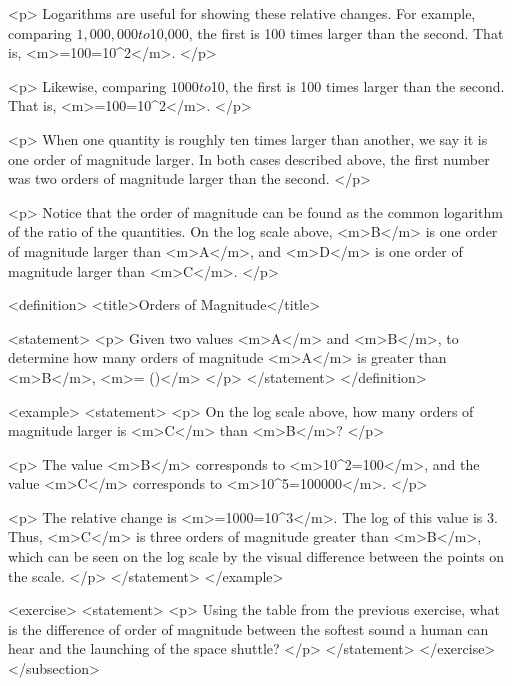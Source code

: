         <p>
            Logarithms are useful for showing these relative changes.
            For example, comparing $1,000,000 to $10,000, the first is 100 times larger than the second.
            That is, <m>=100=10^{2}</m>.
        </p>

        <p>
            Likewise, comparing $1000 to $10, the first is 100 times larger than the second.
            That is, <m>=100=10^{2}</m>.
        </p>

        <p>
            When one quantity is roughly ten times larger than another, we say it is one order of magnitude larger.
            In both cases described above, the first number was two orders of magnitude larger than the second.
        </p>

        <p>
            Notice that the order of magnitude can be found as the common logarithm of the ratio of the quantities.
            On the log scale above, <m>B</m> is one order of magnitude larger than <m>A</m>, and <m>D</m> is one order of magnitude larger than <m>C</m>.
        </p>

        <definition>
            <title>Orders of Magnitude</title>

            <statement>
                <p>
                    Given two values <m>A</m> and <m>B</m>, to determine how many orders of magnitude <m>A</m> is greater than <m>B</m>, <m>= \log()</m>
                </p>
            </statement>
        </definition>

        <example>
            <statement>
                <p>
                    On the log scale above, how many orders of magnitude larger is <m>C</m> than <m>B</m>?
                </p>

                <p>
                    The value <m>B</m> corresponds to <m>10^{2}=100</m>, and the value <m>C</m> corresponds to <m>10^{5}=100000</m>.
                </p>

                <p>
                    The relative change is <m>=1000=10^{3}</m>.
                    The log of this value is 3.
                    Thus, <m>C</m> is three orders of magnitude greater than <m>B</m>, which can be seen on the log scale by the visual difference between the points on the scale.
                </p>
            </statement>
        </example>

        <exercise>
            <statement>
                <p>
                    Using the table from the previous exercise, what is the difference of order of magnitude between the softest sound a human can hear and the launching of the space shuttle?
                </p>
            </statement>
        </exercise>
    </subsection>


